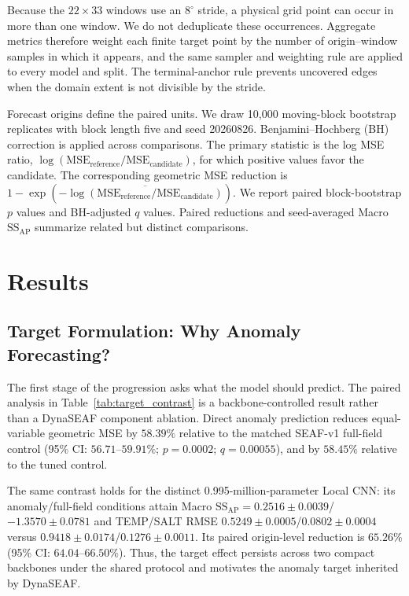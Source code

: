 \documentclass[conference]{IEEEtran}
\begin{document}
Because the $22\times33$ windows use an $8^\circ$ stride, a physical grid point can occur in more than one window. We do not deduplicate these occurrences. Aggregate metrics therefore weight each finite target point by the number of origin--window samples in which it appears, and the same sampler and weighting rule are applied to every model and split. The terminal-anchor rule prevents uncovered edges when the domain extent is not divisible by the stride.

Forecast origins define the paired units. We draw 10,000 moving-block bootstrap replicates with block length five and seed 20260826. Benjamini--Hochberg (BH) correction is applied across comparisons. The primary statistic is the log MSE ratio, $\log(\mathrm{MSE}_{\mathrm{reference}}/\mathrm{MSE}_{\mathrm{candidate}})$, for which positive values favor the candidate. The corresponding geometric MSE reduction is $1-\exp(-\overline{\log(\mathrm{MSE}_{\mathrm{reference}}/\mathrm{MSE}_{\mathrm{candidate}})})$. We report paired block-bootstrap $p$ values and BH-adjusted $q$ values. Paired reductions and seed-averaged Macro $\mathrm{SS}_{\mathrm{AP}}$ summarize related but distinct comparisons.

\FloatBarrier
\section{Results}
\label{sec:results}

\subsection{Target Formulation: Why Anomaly Forecasting?}
The first stage of the progression asks what the model should predict. The paired analysis in Table~\ref{tab:target_contrast} is a backbone-controlled result rather than a DynaSEAF component ablation. Direct anomaly prediction reduces equal-variable geometric MSE by $58.39\%$ relative to the matched SEAF-v1 full-field control (95\% CI: $56.71$--$59.91\%$; $p=0.0002$; $q=0.00055$), and by $58.45\%$ relative to the tuned control.

The same contrast holds for the distinct 0.995-million-parameter Local CNN: its anomaly/full-field conditions attain Macro $\mathrm{SS}_{\mathrm{AP}}=0.2516\pm0.0039$/$-1.3570\pm0.0781$ and TEMP/SALT RMSE $0.5249\pm0.0005$/$0.0802\pm0.0004$ versus $0.9418\pm0.0174$/$0.1276\pm0.0011$. Its paired origin-level reduction is $65.26\%$ (95\% CI: $64.04$--$66.50\%$). Thus, the target effect persists across two compact backbones under the shared protocol and motivates the anomaly target inherited by DynaSEAF.
\end{document}
